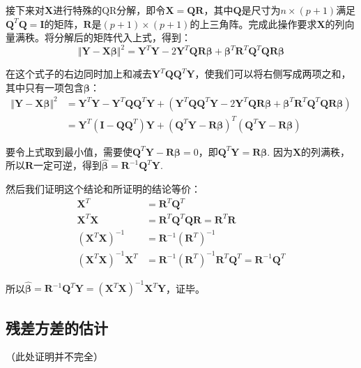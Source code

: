 \documentclass[UTF8]{ctexbook}
\begin{document}
接下来对$\boldsymbol{X}$进行特殊的QR分解，即令$\boldsymbol{X}=\boldsymbol{QR}$，其中$\boldsymbol{Q}$是尺寸为$n\times(p+1)$满足$\boldsymbol{Q}^T\boldsymbol{Q}=\boldsymbol{I}$的矩阵，$\boldsymbol{R}$是$(p+1)\times(p+1)$的上三角阵。完成此操作要求$\boldsymbol{X}$的列向量满秩。将分解后的矩阵代入上式，得到：
\[
	\Vert\boldsymbol{Y}-\boldsymbol{X\beta}\Vert^2=\boldsymbol{Y}^T\boldsymbol{Y}-2\boldsymbol{Y}^T\boldsymbol{QR\beta}+\boldsymbol{\beta}^T\boldsymbol{R}^T\boldsymbol{Q}^T\boldsymbol{QR\beta}
\]

在这个式子的右边同时加上和减去$\boldsymbol{Y}^T\boldsymbol{QQ}^T\boldsymbol{Y}$，使我们可以将右侧写成两项之和，其中只有一项包含$\boldsymbol{\beta}$：
\begin{align*}
	\Vert\boldsymbol{Y}-\boldsymbol{X\beta}\Vert^2&=\boldsymbol{Y}^T\boldsymbol{Y}-\boldsymbol{Y}^T\boldsymbol{QQ}^T\boldsymbol{Y}+(\boldsymbol{Y}^T\boldsymbol{QQ}^T\boldsymbol{Y}-2\boldsymbol{Y}^T\boldsymbol{QR\beta}+\boldsymbol{\beta}^T\boldsymbol{R}^T\boldsymbol{Q}^T\boldsymbol{QR\beta}) \\
	&=\boldsymbol{Y}^T(\boldsymbol{I}-\boldsymbol{QQ}^T)\boldsymbol{Y}+(\boldsymbol{Q}^T\boldsymbol{Y}-\boldsymbol{R\beta})^T(\boldsymbol{Q}^T\boldsymbol{Y}-\boldsymbol{R\beta})
\end{align*}

要令上式取到最小值，需要使$\boldsymbol{Q}^T\boldsymbol{Y}-\boldsymbol{R\beta}=0$，即$\boldsymbol{Q}^T\boldsymbol{Y}=\boldsymbol{R\beta}$. 因为$\boldsymbol{X}$的列满秩，所以$\boldsymbol{R}$一定可逆，得到$\boldsymbol{\hat\beta}=\boldsymbol{R}^{-1}\boldsymbol{Q}^T\boldsymbol{Y}$.

然后我们证明这个结论和所证明的结论等价：
\begin{align*}
	\boldsymbol{X}^T&=\boldsymbol{R}^{T}\boldsymbol{Q}^T \\
	\boldsymbol{X}^T\boldsymbol{X}&=\boldsymbol{R}^{T}\boldsymbol{Q}^T\boldsymbol{QR}=\boldsymbol{R}^T\boldsymbol{R} \\
	(\boldsymbol{X}^T\boldsymbol{X})^{-1}&=\boldsymbol{R}^{-1}(\boldsymbol{R}^T)^{-1} \\
	(\boldsymbol{X}^T\boldsymbol{X})^{-1}\boldsymbol{X}^T&=\boldsymbol{R}^{-1}(\boldsymbol{R}^T)^{-1}\boldsymbol{R}^T\boldsymbol{Q}^T=\boldsymbol{R}^{-1}\boldsymbol{Q}^T
\end{align*}

所以$\boldsymbol{\hat\beta}=\boldsymbol{R}^{-1}\boldsymbol{Q}^T\boldsymbol{Y}=(\boldsymbol{X}^T\boldsymbol{X})^{-1}\boldsymbol{X}^T\boldsymbol{Y}$，证毕。

\subsection{残差方差的估计}
\label{proof15}
（此处证明并不完全）
\end{document}
